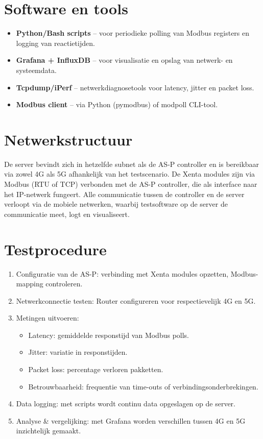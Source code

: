 \section*{Software en tools}

\begin{itemize}
    \item \textbf{Python/Bash scripts} – voor periodieke polling van Modbus registers en logging van reactietijden.
    \item \textbf{Grafana + InfluxDB} – voor visualisatie en opslag van netwerk- en systeemdata.
    \item \textbf{Tcpdump/iPerf} – netwerkdiagnosetools voor latency, jitter en packet loss.
    \item \textbf{Modbus client} – via Python (pymodbus) of modpoll CLI-tool.
\end{itemize}

\section*{Netwerkstructuur}

De server bevindt zich in hetzelfde subnet als de AS-P controller en is bereikbaar via zowel 4G als 5G afhankelijk van het testscenario. De Xenta modules zijn via Modbus (RTU of TCP) verbonden met de AS-P controller, die als interface naar het IP-netwerk fungeert. Alle communicatie tussen de controller en de server verloopt via de mobiele netwerken, waarbij testsoftware op de server de communicatie meet, logt en visualiseert.

\section*{Testprocedure}

\begin{enumerate}
    \item Configuratie van de AS-P: verbinding met Xenta modules opzetten, Modbus-mapping controleren.
    \item Netwerkconnectie testen: Router configureren voor respectievelijk 4G en 5G.
    \item Metingen uitvoeren:
    \begin{itemize}
        \item Latency: gemiddelde responstijd van Modbus polls.
        \item Jitter: variatie in responstijden.
        \item Packet loss: percentage verloren pakketten.
        \item Betrouwbaarheid: frequentie van time-outs of verbindingsonderbrekingen.
    \end{itemize}
    \item Data logging: met scripts wordt continu data opgeslagen op de server.
    \item Analyse \& vergelijking: met Grafana worden verschillen tussen 4G en 5G inzichtelijk gemaakt.
\end{enumerate}

